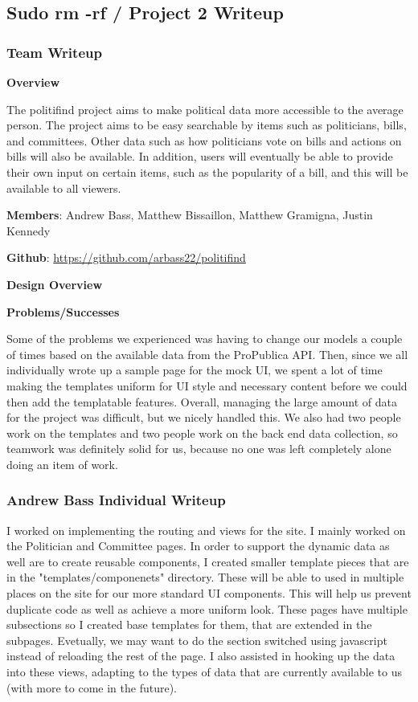 \documentclass{article}
\newcommand{\n}{\noindent}
\begin{document}
\begin{center}
\subsection*{Sudo rm -rf / Project 2 Writeup}
\end{center}

\subsubsection*{Team Writeup}

\textbf{Overview}

The politifind project aims to make political data more accessible to the average person. The project aims to be easy searchable by items such as politicians, bills, and committees. Other data such as how politicians vote on bills and actions on bills will also be available. In addition, users will eventually be able to provide their own input on certain items, such as the popularity of a bill, and this will be available to all viewers.

\n\textbf{Members}: Andrew Bass, Matthew Bissaillon, Matthew Gramigna, Justin Kennedy

\n\textbf{Github}: \url{https://github.com/arbass22/politifind}

\n\textbf{Design Overview}

\n\textbf{Problems/Successes}

Some of the problems we experienced was having to change our models a couple of times based on the available data from the ProPublica API. Then, since we all individually wrote up a sample page for the mock UI, we spent a lot of time making the templates uniform for UI style and necessary content before we could then add the templatable features. Overall, managing the large amount of data for the project was difficult, but we nicely handled this. We also had two people work on the templates and two people work on the back end data collection, so teamwork was definitely solid for us, because no one was left completely alone doing an item of work.

\pagebreak

\subsubsection*{Andrew Bass Individual Writeup}
I worked on implementing the routing and views for the site.  I mainly worked on the Politician and Committee pages.  In order to support the dynamic data as well are to create reusable components, I created smaller template pieces that are in the "templates/componenets" directory.  These will be able to used in multiple places on the site for our more standard UI components.  This will help us prevent duplicate code as well as achieve a more uniform look.  These pages have multiple subsections so I created base templates for them, that are extended in the subpages. Evetually, we may want to do the section switched using javascript instead of reloading the rest of the page. I also assisted in hooking up the data into these views, adapting to the types of data that are currently available to us (with more to come in the future).\\
\end{document}
